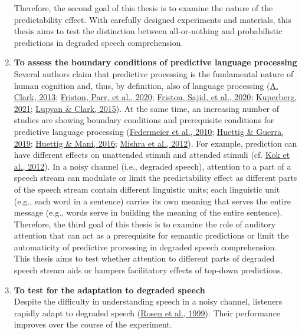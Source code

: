 \documentclass[a4paper, nobind]{templates/ociamthesis}
\begin{document}
\begin{enumerate}
  Therefore, the second goal of this thesis is to examine the nature of the predictability effect.
  With carefully designed experiments and materials, this thesis aims to test the distinction between all-or-nothing and probabilistic predictions in degraded speech comprehension.
\item
  \textbf{To assess the boundary conditions of predictive language processing}\\
  Several authors claim that predictive processing is the fundamental nature of human cognition and, thus, by definition, also of language processing (\protect\hyperlink{ref-Clark2013}{A. Clark, 2013}; \protect\hyperlink{ref-Friston2020}{Friston, Parr, et al., 2020}; \protect\hyperlink{ref-Friston2020b}{Friston, Sajid, et al., 2020}; \protect\hyperlink{ref-Kuperberg2020}{Kuperberg, 2021}; \protect\hyperlink{ref-Lupyan2015}{Lupyan \& Clark, 2015}).
  At the same time, an increasing number of studies are showing boundary conditions and prerequisite conditions for predictive language processing (\protect\hyperlink{ref-Federmeier2010}{Federmeier et al., 2010}; \protect\hyperlink{ref-Huettig2019}{Huettig \& Guerra, 2019}; \protect\hyperlink{ref-Huettig2016}{Huettig \& Mani, 2016}; \protect\hyperlink{ref-Mishra2012}{Mishra et al., 2012}).
  For example, prediction can have different effects on unattended stimuli and attended stimuli (cf. \protect\hyperlink{ref-Kok2012}{Kok et al., 2012}).
  In a noisy channel (i.e., degraded speech), attention to a part of a speech stream can modulate or limit the predictability effect as different parts of the speech stream contain different linguistic units;
  each linguistic unit (e.g., each word in a sentence) carries its own meaning that serves the entire message (e.g., words serve in building the meaning of the entire sentence).
  Therefore, the third goal of this thesis is to examine the role of auditory attention that can act as a prerequisite for semantic predictions
  or limit the automaticity of predictive processing in degraded speech comprehension.\\
  This thesis aims to test whether attention to different parts of degraded speech stream aids or hampers facilitatory effects of top-down predictions.
\item
  \textbf{To test for the adaptation to degraded speech}\\
  Despite the difficulty in understanding speech in a noisy channel,
  listeners rapidly adapt to degraded speech (\protect\hyperlink{ref-Rosen1999}{Rosen et al., 1999}):
  Their performance improves over the course of the experiment.

\end{enumerate}
\end{document}
